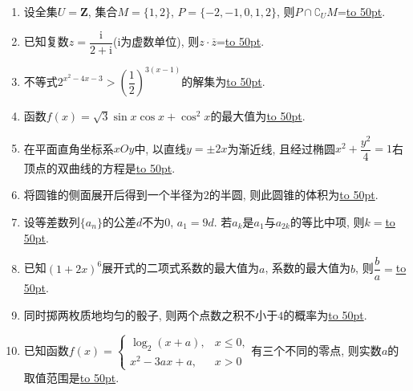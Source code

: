 \documentclass[10pt,a4paper]{article}
\newcommand{\blank}[1]{\underline{\hbox to #1pt{}}}
\begin{document}
\begin{enumerate}[1.]

\item 设全集$U=\mathbf{Z}$, 集合$M=\{1,2\}$, $P=\{-2,-1,0,1,2\}$, 则$P\cap \complement_U M$=\blank{50}.
\item 已知复数$z=\dfrac{\mathrm{i}}{2+\mathrm{i}}$($\mathrm{i}$为虚数单位), 则$z\cdot \overline z$=\blank{50}.
\item 不等式$2^{x^2-4x-3}>(\dfrac12 )^{3(x-1)}$的解集为\blank{50}.
\item 函数$f(x)=\sqrt3\sin x\cos x+\cos^2x$的最大值为\blank{50}.
\item 在平面直角坐标系$xOy$中, 以直线$y=\pm 2x$为渐近线, 且经过椭圆$x^2+\dfrac{y^2}4=1$右顶点的双曲线的方程是\blank{50}.
\item 将圆锥的侧面展开后得到一个半径为$2$的半圆, 则此圆锥的体积为\blank{50}.
\item 设等差数列$\{a_n\}$的公差$d$不为$0$, $a_1=9d$. 若$a_k$是$a_1$与$a_{2k}$的等比中项, 则$k=$\blank{50}.
\item 已知$(1+2x)^6$展开式的二项式系数的最大值为$a$, 系数的最大值为$b$, 则$\dfrac ba=$\blank{50}.
\item 同时掷两枚质地均匀的骰子, 则两个点数之积不小于$4$的概率为\blank{50}.
\item 已知函数$f(x)=\begin{cases} \log_2 (x+a), & x\le 0, \\ x^2-3ax+a, & x>0 \end{cases}$有三个不同的零点, 则实数$a$的取值范围是\blank{50}.



\end{enumerate}
\end{document}
